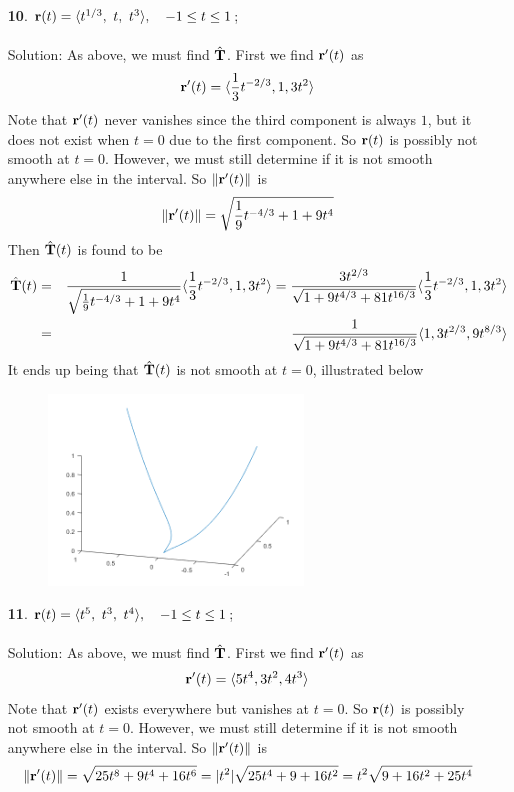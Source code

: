 \documentclass[12pt]{amsbook}
\newcommand{\la}{\langle}
\newcommand{\ra}{\rangle}
\begin{document}
\begin{enumerate}
\begin{center}
\end{center}  
  \item[{\small\bf 10}.] ${\bf r}(t)=\la t^{1/3}, \ t, \ t^3\ra, \ \ \ -1 \leq t \leq 1$;
  \\
  \\
  {\sc Solution}: As above, we must find $\hat{\bf T}$. First we find ${\bf r}'(t)$ as
  $${\bf r}'(t)=\la \frac{1}{3}t^{-2/3},1,3t^2 \ra$$
  Note that ${\bf r}'(t)$ never vanishes since the third component is always $1$, but it does not exist when $t=0$ due to the first component. So ${\bf r}(t)$ is possibly not smooth at $t=0$. However, we must still determine if it is not smooth anywhere else in the interval. So $\|{\bf r}'(t)\|$ is
  $$\|{\bf r}'(t)\|=\sqrt{\frac{1}{9}t^{-4/3}+1+9t^4}$$
  Then $\hat{\bf T}(t)$ is found to be
\begin{eqnarray*}
\hat{\bf T}(t)&=&\frac{1}{\sqrt{\frac{1}{9}t^{-4/3}+1+9t^4}}\la \frac{1}{3}t^{-2/3},1,3t^2 \ra=\frac{3t^{2/3}}{\sqrt{1+9t^{4/3}+81t^{16/3}}}\la \frac{1}{3}t^{-2/3},1,3t^2 \ra\\
&=&\frac{1}{\sqrt{1+9t^{4/3}+81t^{16/3}}}\la 1,3t^{2/3},9t^{8/3} \ra
\end{eqnarray*}  
It ends up being that $\hat{\bf T}(t)$ is not smooth at $t=0$, illustrated below
\begin{center}
\includegraphics[width=3.5in,height=2.0in]{2_11_10.png}
\end{center} 
  \item[{\small\bf 11}.] ${\bf r}(t)=\la t^5, \ t^3, \ t^4\ra, \ \ \ -1 \leq t \leq 1$;
  \\
  \\
  {\sc Solution}: As above, we must find $\hat{\bf T}$. First we find ${\bf r}'(t)$ as
  $${\bf r}'(t)=\la 5t^4,3t^2,4t^3 \ra$$
  Note that ${\bf r}'(t)$ exists everywhere but vanishes at $t=0$. So ${\bf r}(t)$ is possibly not smooth at $t=0$. However, we must still determine if it is not smooth anywhere else in the interval. So $\|{\bf r}'(t)\|$ is
  $$\|{\bf r}'(t)\|=\sqrt{25t^8+9t^4+16t^6}=|t^2|\sqrt{25t^4+9+16t^2}=t^2\sqrt{9+16t^2+25t^4}$$

\end{enumerate}
\end{document}
